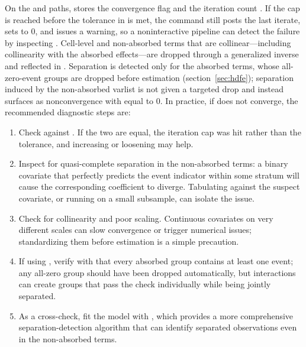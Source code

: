 \documentclass[12pt,a4paper]{article}
\begin{document}
On the  and  paths,  stores
the convergence flag  and the iteration count
. If the cap  is reached before the
tolerance in  is met, the command still posts the
last iterate, sets  to \(0\), and issues a warning,
so a noninteractive pipeline can detect the failure by inspecting
. Cell-level and non-absorbed terms that are
collinear---including collinearity with the absorbed effects---are
dropped through a generalized inverse and reflected in .
Separation is detected only for the absorbed terms, whose all-zero-event
groups are dropped before estimation
(section~\ref{sec:hdfe}); separation induced by the
non-absorbed varlist is not given a targeted drop and instead surfaces
as nonconvergence with  equal to \(0\). In practice,
if  does not converge, the recommended diagnostic steps
are:

\begin{enumerate}
\item Check  against .  If the two are equal, the iteration cap was hit rather than the tolerance, and increasing  or loosening  may help.
\item Inspect for quasi-complete separation in the non-absorbed terms: a binary covariate that perfectly predicts the event indicator within some stratum will cause the corresponding coefficient to diverge.  Tabulating  against the suspect covariate, or running  on a small subsample, can isolate the issue.
\item Check for collinearity and poor scaling.  Continuous covariates on very different scales can slow convergence or trigger numerical issues; standardizing them before estimation is a simple precaution.
\item If using , verify with  that every absorbed group contains at least one event; any all-zero group should have been dropped automatically, but interactions can create groups that pass the check individually while being jointly separated.
\item As a cross-check, fit the model with  \citep{correia2020}, which provides a more comprehensive separation-detection algorithm that can identify separated observations even in the non-absorbed terms.
\end{enumerate}
\end{document}
